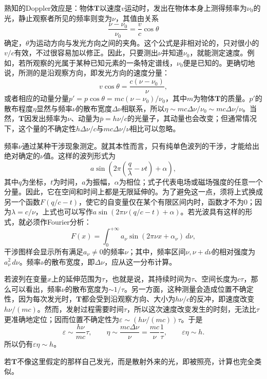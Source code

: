 \documentclass[fontsize=13pt,twoside,openany,headings=normal,parskip=false,bookmarkpackage=false,DIV=calc]{scrbook}
\begin{document}
熟知的Doppler效应是：物体$\boldsymbol{T}$以速度$v$运动时，发出在物体本身上测得频率为$\nu_0$的光，静止观察者所见的频率则变为$\nu$，其值由关系
\[
\frac{\nu-\nu_0}{\nu_0}=\frac vc\cos\theta
\]
确定，$\theta$为运动方向与发光方向之间的夹角。这个公式是非相对论的，只对很小的$v/c$有效，不过很容易加以修正。因此，只要测出$\nu$并知道$\nu_0$，就能测定速度。例如，若所观察的光属于某种已知元素的一条特定谱线，$\nu_0$便是已知的。更确切地说，所测的是沿观察方向，即发光方向的速度分量：
\[
v\cos\theta=\frac{c(\nu-\nu_0)}\nu,
\]
或者相应的动量分量$p'=p\cos\theta=mc(\nu-\nu_0)/\nu_0$，其中$m$为物体$\boldsymbol{T}$的质量。$p'$的散布程度$\eta$显然与频率$\nu$的散布宽度$\Delta\nu$相联系，所以$\eta\sim mc\Delta\nu/\nu_0\sim mc\Delta\nu/\nu$。当然，$\boldsymbol{T}$因发出频率为$\nu$、动量为$\bar p=h\nu/c$的光量子，其动量也会改变；但通常情况下，这个量的不确定性$h\Delta\nu/c$与$mc\Delta\nu/\nu$相比可以忽略。

频率$\nu$通过某种干涉现象测定。就其本性而言，只有纯单色波列的干涉，才能给出绝对确定的$\nu$值。这样的波列形式为
\[
a\sin\left(2\pi\left(\frac q\lambda-\nu t\right)+\alpha\right),
\]
其中$q$为坐标，$t$为时间，$a$为振幅，$\alpha$为相位；式子代表电场或磁场强度的任意一个分量。因此，它在空间和时间上都是无限延伸的。为了避免这一点，须将上式换成另一个函数$F(q/c-t)$，使它的自变量仅在某个有限区间内时，函数才不为$0$；因为$\lambda=c/\nu$，上式也可以写作$a\sin(2\pi\nu(q/c-t)+\alpha)$。若光波具有这样的形式，就必须作Fourier分析：
\[
F(x)=\int_0^{+\infty}a_\nu\sin(2\pi\nu x+\alpha_\nu)\,d\nu,
\]\hypertarget{origpage-130}{}\label{origpage-130}干涉图样会显示所有满足$a_\nu\ne0$的频率$\nu$；其中，频率区间$\nu,\allowbreak \nu+d\nu$的相对强度为$a_\nu^2\,d\nu$。频率$\nu$的散布宽度，即$\Delta\nu$，应从这一分布计算。

若波列在变量$x$上的延伸范围为$\tau$，也就是说，其持续时间为$\tau$、空间长度为$c\tau$，那么可以看出，频率$\nu$的散布宽度为$\sim1/\tau$。另一方面，这种测量会造成位置不确定性，因为每次发光时，$\boldsymbol{T}$都会受到沿观察方向、大小为$h\nu/c$的反冲，即速度改变$h\nu/(mc)$。然而，发射过程需要时间$\tau$，所以这次速度改变发生的时刻，无法比$\tau$更准确地定位；因而位置不确定性为$\varepsilon\sim(h\nu/(mc))\tau$。于是
\[
\varepsilon\sim\frac{h\nu}{mc}\tau,\qquad
\eta\sim\frac{mc\Delta\nu}\nu=\frac{mc}\nu\frac1\tau,\qquad
\varepsilon\eta\sim h.
\]
所以仍有$\varepsilon\eta\sim h$。

若$\boldsymbol{T}$不像这里假定的那样自己发光，而是散射外来的光，即被照亮，计算也完全类似。
\end{document}
